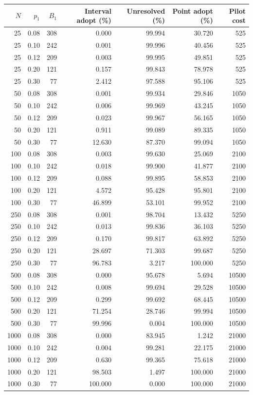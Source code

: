 \begin{tabular}{rrrrrrr}
\toprule
$N$ & $p_1$ & $B_1$ & Interval adopt (\%) & Unresolved (\%) & Point adopt (\%) & Pilot cost\\
\midrule
25 & 0.08 & 308 & 0.000 & 99.994 & 30.720 & 525\\
25 & 0.10 & 242 & 0.001 & 99.996 & 40.456 & 525\\
25 & 0.12 & 209 & 0.003 & 99.995 & 49.851 & 525\\
25 & 0.20 & 121 & 0.157 & 99.843 & 78.978 & 525\\
25 & 0.30 & 77 & 2.412 & 97.588 & 95.106 & 525\\
\midrule
50 & 0.08 & 308 & 0.001 & 99.934 & 29.846 & 1050\\
50 & 0.10 & 242 & 0.006 & 99.969 & 43.245 & 1050\\
50 & 0.12 & 209 & 0.023 & 99.967 & 56.165 & 1050\\
50 & 0.20 & 121 & 0.911 & 99.089 & 89.335 & 1050\\
50 & 0.30 & 77 & 12.630 & 87.370 & 99.094 & 1050\\
\midrule
100 & 0.08 & 308 & 0.003 & 99.630 & 25.069 & 2100\\
100 & 0.10 & 242 & 0.018 & 99.900 & 41.877 & 2100\\
100 & 0.12 & 209 & 0.088 & 99.895 & 58.853 & 2100\\
100 & 0.20 & 121 & 4.572 & 95.428 & 95.801 & 2100\\
100 & 0.30 & 77 & 46.899 & 53.101 & 99.952 & 2100\\
\midrule
250 & 0.08 & 308 & 0.001 & 98.704 & 13.432 & 5250\\
250 & 0.10 & 242 & 0.013 & 99.836 & 36.103 & 5250\\
250 & 0.12 & 209 & 0.170 & 99.817 & 63.892 & 5250\\
250 & 0.20 & 121 & 28.697 & 71.303 & 99.687 & 5250\\
250 & 0.30 & 77 & 96.783 & 3.217 & 100.000 & 5250\\
\midrule
500 & 0.08 & 308 & 0.000 & 95.678 & 5.694 & 10500\\
500 & 0.10 & 242 & 0.008 & 99.694 & 29.528 & 10500\\
500 & 0.12 & 209 & 0.299 & 99.692 & 68.445 & 10500\\
500 & 0.20 & 121 & 71.254 & 28.746 & 99.994 & 10500\\
500 & 0.30 & 77 & 99.996 & 0.004 & 100.000 & 10500\\
\midrule
1000 & 0.08 & 308 & 0.000 & 83.945 & 1.242 & 21000\\
1000 & 0.10 & 242 & 0.004 & 99.281 & 22.175 & 21000\\
1000 & 0.12 & 209 & 0.630 & 99.365 & 75.618 & 21000\\
1000 & 0.20 & 121 & 98.503 & 1.497 & 100.000 & 21000\\
1000 & 0.30 & 77 & 100.000 & 0.000 & 100.000 & 21000\\
\bottomrule
\end{tabular}

